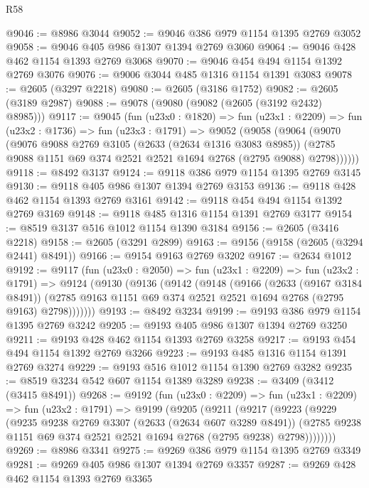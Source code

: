 \begin{lexlean}{R58}
\begin{coremodule}
@9046 := @8986 @3044
@9052 := @9046 @386 @979 @1154 @1395 @2769 @3052
@9058 := @9046 @405 @986 @1307 @1394 @2769 @3060
@9064 := @9046 @428 @462 @1154 @1393 @2769 @3068
@9070 := @9046 @454 @494 @1154 @1392 @2769 @3076
@9076 := @9006 @3044 @485 @1316 @1154 @1391 @3083
@9078 := @2605 (@3297 @2218)
@9080 := @2605 (@3186 @1752)
@9082 := @2605 (@3189 @2987)
@9088 := @9078 (@9080 (@9082 (@2605 (@3192 @2432) @8985)))
@9117 := @9045
    (fun (u23x0 : @1820) =>
    fun (u23x1 : @2209) =>
    fun (u23x2 : @1736) =>
    fun (u23x3 : @1791) =>
    @9052
      (@9058
        (@9064
          (@9070
            (@9076
              @9088
              @2769
              @3105
              (@2633 (@2634 @1316 @3083 @8985))
              (@2785 @9088 @1151 @69 @374 @2521 @2521 @1694 @2768 (@2795 @9088) @2798))))))
@9118 := @8492 @3137
@9124 := @9118 @386 @979 @1154 @1395 @2769 @3145
@9130 := @9118 @405 @986 @1307 @1394 @2769 @3153
@9136 := @9118 @428 @462 @1154 @1393 @2769 @3161
@9142 := @9118 @454 @494 @1154 @1392 @2769 @3169
@9148 := @9118 @485 @1316 @1154 @1391 @2769 @3177
@9154 := @8519 @3137 @516 @1012 @1154 @1390 @3184
@9156 := @2605 (@3416 @2218)
@9158 := @2605 (@3291 @2899)
@9163 := @9156 (@9158 (@2605 (@3294 @2441) @8491))
@9166 := @9154 @9163 @2769 @3202
@9167 := @2634 @1012
@9192 := @9117
    (fun (u23x0 : @2050) =>
    fun (u23x1 : @2209) =>
    fun (u23x2 : @1791) =>
    @9124
      (@9130
        (@9136
          (@9142
            (@9148
              (@9166
                (@2633 (@9167 @3184 @8491))
                (@2785 @9163 @1151 @69 @374 @2521 @2521 @1694 @2768 (@2795 @9163) @2798)))))))
@9193 := @8492 @3234
@9199 := @9193 @386 @979 @1154 @1395 @2769 @3242
@9205 := @9193 @405 @986 @1307 @1394 @2769 @3250
@9211 := @9193 @428 @462 @1154 @1393 @2769 @3258
@9217 := @9193 @454 @494 @1154 @1392 @2769 @3266
@9223 := @9193 @485 @1316 @1154 @1391 @2769 @3274
@9229 := @9193 @516 @1012 @1154 @1390 @2769 @3282
@9235 := @8519 @3234 @542 @607 @1154 @1389 @3289
@9238 := @3409 (@3412 (@3415 @8491))
@9268 := @9192
    (fun (u23x0 : @2209) =>
    fun (u23x1 : @2209) =>
    fun (u23x2 : @1791) =>
    @9199
      (@9205
        (@9211
          (@9217
            (@9223
              (@9229
                (@9235
                  @9238
                  @2769
                  @3307
                  (@2633 (@2634 @607 @3289 @8491))
                  (@2785 @9238 @1151 @69 @374 @2521 @2521 @1694 @2768 (@2795 @9238) @2798))))))))
@9269 := @8986 @3341
@9275 := @9269 @386 @979 @1154 @1395 @2769 @3349
@9281 := @9269 @405 @986 @1307 @1394 @2769 @3357
@9287 := @9269 @428 @462 @1154 @1393 @2769 @3365

\end{coremodule}
\end{lexlean}
